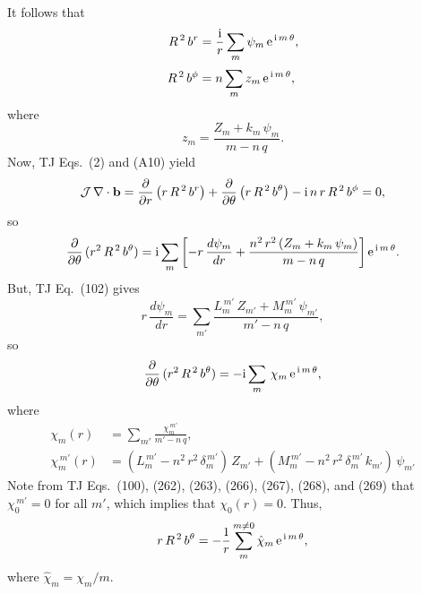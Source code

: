 \documentclass[12pt,prb,aps,notitlepage]{revtex4-1}
\begin{document}
It follows that
\begin{align}
R^{\,2}\,b^r &= \frac{{\rm i}}{r}\sum_m \psi_m\,{\rm e}^{\,{\rm i}\,m \,\theta},\\[0.5ex]
R^{\,2}\,b^\phi &= n\sum_m z_m\,{\rm e}^{\,{\rm i}\,m\,\theta},
\end{align}
where 
\begin{equation}
z_m =  \frac{Z_m+ k_m\,\psi_m}{m-n\,q}.
\end{equation}
Now,  TJ Eqs.~(2) and (A10) yield
\begin{align}
{\cal J}\,\nabla\cdot{\bf b} = \frac{\partial}{\partial r}\left(r\,R^{\,2}\,b^r\right) + \frac{\partial}{\partial \theta}\left(r\,R^{\,2}\,b^\theta\right) - {\rm i}\,n\,r\,R^{\,2}\,b^\phi = 0,
\end{align}
so
\begin{equation}
\frac{\partial}{\partial\theta}\,(r^2\,R^{\,2}\,b^\theta)={\rm i}\sum_m\left[-r\,\frac{d\psi_m}{dr}+ \frac{n^2\,r^2\,(Z_m+k_m\,\psi_m)}{m-n\,q}\right]{\rm e}^{\,{\rm i}\,m\,\theta}.
\end{equation}
But, TJ Eq.~(102) gives
\begin{equation}
r\,\frac{d\psi_m}{dr}=\sum_{m'} \frac{L_{m}^{\,m'}\,Z_{m'} + M_m^{\,m'}\,\psi_{m'}}{m'-n\,q},
\end{equation}
so
\begin{equation}
\frac{\partial}{\partial\theta}\,(r^2\,R^{\,2}\,b^\theta)=-{\rm i}\sum_{m}\,\chi_m\,{\rm e}^{\,{\rm i}\,m\,\theta},
\end{equation}
where
\begin{align}
\chi_m(r)& = \sum_{m'}\frac{\chi_m^{\,m'}}{m'-n\,q},\\[0.5ex]
\chi_m^{\,m'}(r) &= (L_m^{\,m'}- n^2\,r^2\,\delta_m^{\,m'})\,Z_{m'} + (M_m^{\,m'}-n^2\,r^2\,\delta_{m}^{\,m'}\,k_{m'})\,\psi_{m'}
\end{align}
Note from TJ Eqs.~(100), (262), (263), (266), (267), (268), and (269) that $\chi_0^{\,m'}= 0$ for all $m'$, which implies that $\chi_0(r)=0$. 
Thus,
\begin{equation}
r\,R^{\,2}\,b^\theta = -\frac{1}{r}\sum_{m}^{m\neq 0} \hat{\chi}_m\,{\rm e}^{\,{\rm i}\,m\,\theta},
\end{equation}
where $\hat{\chi}_m = \chi_m/m$. 
\end{document}
